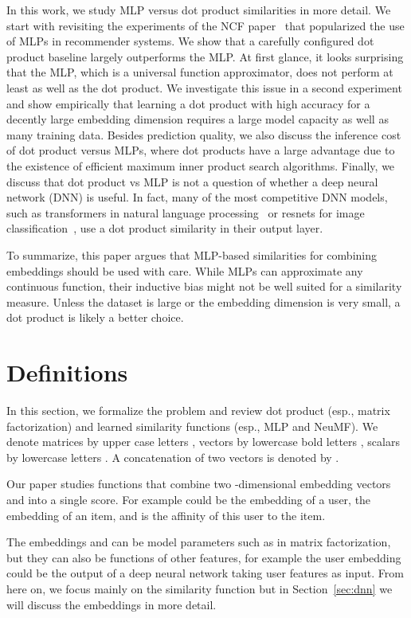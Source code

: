 \documentclass{article}
\begin{document}
In this work, we study MLP versus dot product similarities in more detail.
We start with revisiting the experiments of the NCF paper~\cite{he:www17} that popularized the use of MLPs in recommender systems.
We show that a carefully configured dot product baseline largely outperforms the MLP.
At first glance, it looks surprising that the MLP, which is a universal function approximator, does not perform at least as well as the dot product.
We investigate this issue in a second experiment and show empirically that learning a dot product with high accuracy for a decently large embedding dimension requires a large model capacity as well as many training data.
Besides prediction quality, we also discuss the inference cost of dot product versus MLPs, where dot products have a large advantage due to the existence of efficient maximum inner product search algorithms.
Finally, we discuss that dot product vs MLP is not a question of whether a deep neural network (DNN) is useful.
In fact, many of the most competitive DNN models, such as transformers in natural language processing~\cite{devlin:arxiv18} or resnets for image classification~\cite{he:cvpr16}, use a dot product similarity in their output layer.

To summarize, this paper argues that MLP-based similarities for combining embeddings should be used with care.
While MLPs can approximate any continuous function, their inductive bias might not be well suited for a similarity measure.
Unless the dataset is large or the embedding dimension is very small, a dot product is likely a better choice.


\section{Definitions}
\label{sec:def}

In this section, we formalize the problem and review dot product (esp., matrix factorization) and learned similarity functions (esp., MLP and NeuMF).
We denote matrices by upper case letters , vectors by lowercase bold letters , scalars by lowercase letters .
A concatenation of two vectors  is denoted by .

Our paper studies functions  that combine two -dimensional embedding vectors  and  into a single score.
For example  could be the embedding of a user,  the embedding of an item, and  is the affinity of this user to the item.

The embeddings  and  can be model parameters such as in matrix factorization, but they can also be functions of other features, for example the user embedding  could be the output of a deep neural network taking user features as input. From here on, we focus mainly on the similarity function  but in Section~\ref{sec:dnn} we will discuss the embeddings in more detail.
\end{document}
